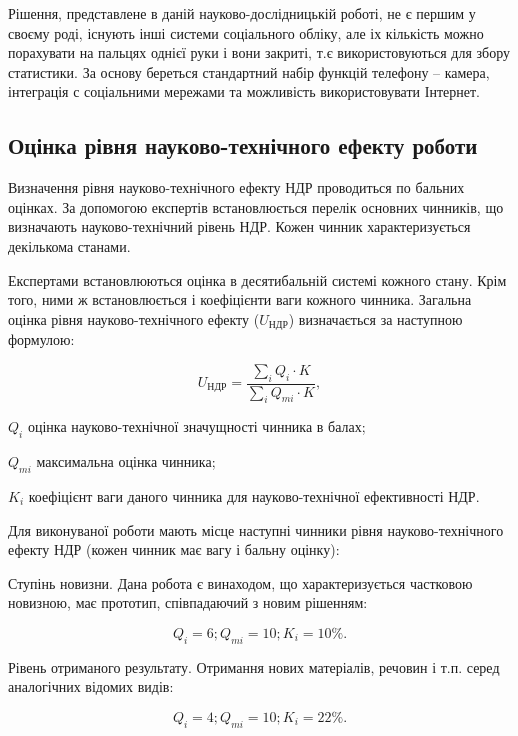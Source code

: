 Рішення, представлене в даній науково-дослідницькій роботі, не є першим у своєму роді, існують інші системи соціального обліку, але іх кількість можно порахувати на пальцях однієї руки і вони закриті, т.є використовуються для збору статистики. За основу береться стандартний набір функцій телефону – камера, інтеграція с соціальними мережами та можливість використовувати Інтернет.
    \subsection{Оцінка рівня науково-технічного ефекту роботи}
Визначення рівня науково-технічного ефекту НДР проводиться по бальних оцінках. За допомогою експертів встановлюється перелік основних чинників, що визначають науково-технічний рівень НДР. Кожен чинник характеризується декількома станами.

Експертами встановлюються оцінка в десятибальній системі кожного стану. Крім того, ними ж встановлюється і коефіцієнти ваги кожного чинника. Загальна оцінка рівня науково-технічного ефекту ($U_{\text{НДР}}$) визначається за наступною формулою:
  
\begin{equation}
U_{\text{НДР}} =  \frac{\sum \limits_{i} Q_i   \cdot   K}{\sum \limits_{i} Q_{mi}   \cdot   K}, \nonumber
\end{equation}
\begin{formulaDescription}
\item [\mbox{$ Q_i $}] оцінка науково-технічної значущності чинника в балах;
\item [\mbox{$ Q_{mi} $}] максимальна оцінка чинника;
\item [\mbox{$ K_i $}] коефіцієнт ваги даного чинника для науково-технічної ефективності НДР.
\end{formulaDescription}  


Для виконуваної роботи мають місце наступні чинники рівня науково-технічного ефекту НДР (кожен чинник має вагу і бальну оцінку):

Ступінь новизни. Дана робота є винаходом, що характеризується частковою новизною, має прототип, співпадаючий з новим рішенням:

\begin{equation}
Q_i = 6; Q_{mi} = 10; K_i = 10\%. \nonumber
\end{equation}

Рівень отриманого результату. Отримання нових матеріалів, речовин і т.п. серед аналогічних відомих видів:

\begin{equation}
Q_i = 4; Q_{mi} = 10; K_i = 22\%. \nonumber
\end{equation}

